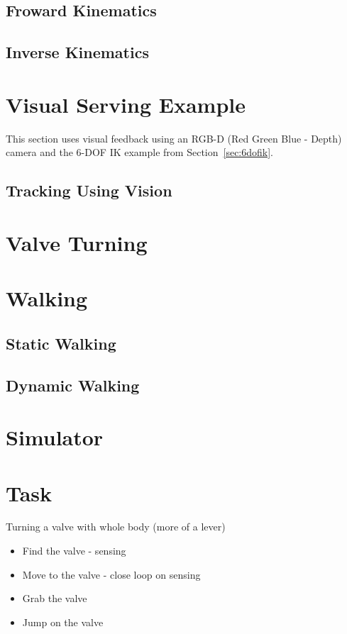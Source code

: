 	\subsection{Froward Kinematics} 
		
	\subsection{Inverse Kinematics}\label{sec:ik}
			
			
\section{Visual Serving Example}
This section uses visual feedback using an RGB-D (Red Green Blue - Depth) camera and the 6-DOF IK example from Section~\ref{sec:6dofik}.
	\subsection{Tracking Using Vision}
		
		
		
\section{Valve Turning}
	

\section{Walking}
	
	\subsection{Static Walking}\label{sec:staticWalking}
		
	\subsection{Dynamic Walking}\label{sec:dynamicWalking}
		

\section{Simulator}\label{sec:simulator}
	


\section{Task}\label{sec:task}
Turning a valve with whole body (more of a lever)
\begin{itemize}
\item Find the valve - sensing
\item Move to the valve - close loop on sensing
\item Grab the valve
\item Jump on the valve
\end{itemize}



